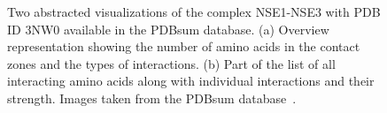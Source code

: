 \documentclass[twocolumn]{bmcart}%
\begin{document}
\begin{figure}[tb]
  \centering	
  \caption{ Two abstracted visualizations of the complex NSE1-NSE3 with PDB ID 3NW0 available in the PDBsum database. (a) Overview representation showing the number of amino acids in the contact zones and the types of interactions. (b) Part of the list of all interacting amino acids along with individual interactions and their strength. Images taken from the PDBsum database~\cite{pdbsum}.}
    \label{fig:pdbsum}
\end{figure}

\end{document}
